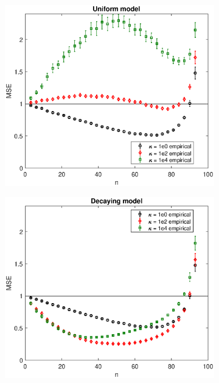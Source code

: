 \documentclass[11pt]{article}
\begin{document}
\begin{figure}[H]
\begin{subfigure}[t]{0.48\textwidth}
  \caption{}
\end{subfigure}
\begin{subfigure}[t]{0.48\textwidth}
    \includegraphics[width=\textwidth]{figs/implicit/implicit_mse_uniform}
  \caption{}
\end{subfigure}
\hfill
\begin{subfigure}[t]{0.48\textwidth}
    \includegraphics[width=\textwidth]{figs/implicit/implicit_mse_decaying}

\end{subfigure}
\end{figure}
\end{document}
